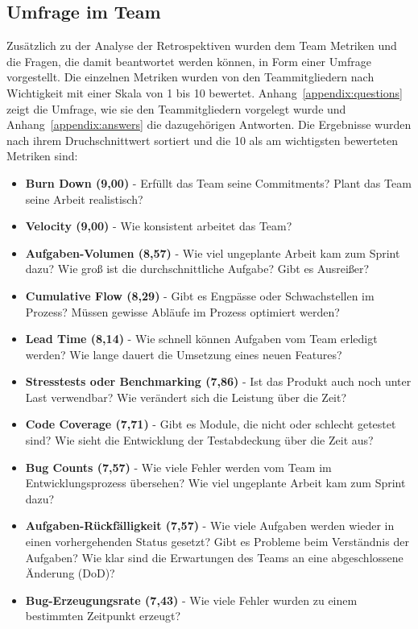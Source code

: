 \subsection{Umfrage im Team}

Zusätzlich zu der Analyse der Retrospektiven wurden dem Team Metriken und die Fragen, die damit beantwortet werden können, in Form einer Umfrage vorgestellt.
Die einzelnen Metriken wurden von den Teammitgliedern nach Wichtigkeit mit einer Skala von 1 bis 10 bewertet.
Anhang~\ref{appendix:questions} zeigt die Umfrage, wie sie den Teammitgliedern vorgelegt wurde und Anhang~\ref{appendix:answers} die dazugehörigen Antworten.
Die Ergebnisse wurden nach ihrem Druchschnittwert sortiert und die 10 als am wichtigsten bewerteten Metriken sind:

\begin{itemize}[noitemsep]
    \item \textbf{Burn Down (9,00)} \mbox{-} Erfüllt das Team seine Commitments? Plant das Team seine Arbeit realistisch?
    \item \textbf{Velocity (9,00)} \mbox{-} Wie konsistent arbeitet das Team?
    \item \textbf{Aufgaben-Volumen (8,57)} \mbox{-} Wie viel ungeplante Arbeit kam zum Sprint dazu? Wie groß ist die durchschnittliche Aufgabe? Gibt es Ausreißer?
    \item \textbf{Cumulative Flow (8,29)} \mbox{-} Gibt es Engpässe oder Schwachstellen im Prozess? Müssen gewisse Abläufe im Prozess optimiert werden?
    \item \textbf{Lead Time (8,14)} \mbox{-} Wie schnell können Aufgaben vom Team erledigt werden? Wie lange dauert die Umsetzung eines neuen Features?
    \item \textbf{Stresstests oder Benchmarking (7,86)} \mbox{-} Ist das Produkt auch noch unter Last verwendbar? Wie verändert sich die Leistung über die Zeit?
    \item \textbf{Code Coverage (7,71)} \mbox{-} Gibt es Module, die nicht oder schlecht getestet sind? Wie sieht die Entwicklung der Testabdeckung über die Zeit aus?
    \item \textbf{Bug Counts (7,57)} \mbox{-} Wie viele Fehler werden vom Team im Entwicklungsprozess übersehen? Wie viel ungeplante Arbeit kam zum Sprint dazu?
    \item \textbf{Aufgaben-Rückfälligkeit (7,57)} \mbox{-} Wie viele Aufgaben werden wieder in einen vorhergehenden Status gesetzt? Gibt es Probleme beim Verständnis der Aufgaben? Wie klar sind die Erwartungen des Teams an eine abgeschlossene Änderung (DoD)?
    \item \textbf{Bug-Erzeugungsrate (7,43)} \mbox{-} Wie viele Fehler wurden zu einem bestimmten Zeitpunkt erzeugt?
\end{itemize}

